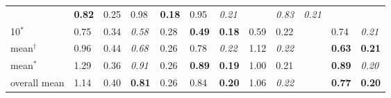 \documentclass[runningheads]{llncs}
\begin{document}
\begin{table}[tb]
\begin{tabular}{C{1.5cm}|C{0.9cm}C{0.9cm}|C{0.95cm}C{0.95cm}|C{0.75cm}C{0.75cm}|C{0.75cm}C{0.75cm}|C{2pt}|C{0.8cm}C{0.8cm}}
		& \textbf{0.82} & 0.25 & 0.98 & \textbf{0.18} 
		&0.95&\textit{0.21}&&\textit{0.83} & 
		\textit{0.21}\\
		10$^\ast$  & 0.75 & 0.34 
		& \textit{0.58} & 0.28 & \textbf{0.49} & \textbf{0.18} 
		&0.59&0.22&&0.74 & 
		\textit{0.21}\\
		\hline
		\hline
		mean$^\dagger$ & 0.96 & 0.44& \textit{0.68} & 0.26 &0.78 & 
		\textit{0.22} & 
		1.12&\textit{0.22}&&\textbf{0.63} & \textbf{0.21}\\
		mean$^\ast$ & 1.29 & 0.36& \textit{0.91} & 0.26 &\textbf{0.89} & 
		\textbf{0.19} & 
		1.00&0.21&&\textbf{0.89} & \textit{0.20}\\
		overall mean & 1.14 & 0.40& \textbf{0.81} & 0.26 &0.84 & 
		\textbf{0.20} & 
		1.06&\textit{0.22}&&\textbf{0.77} & \textbf{0.20}\\
	\end{tabular}
	

\end{table}
\end{document}
